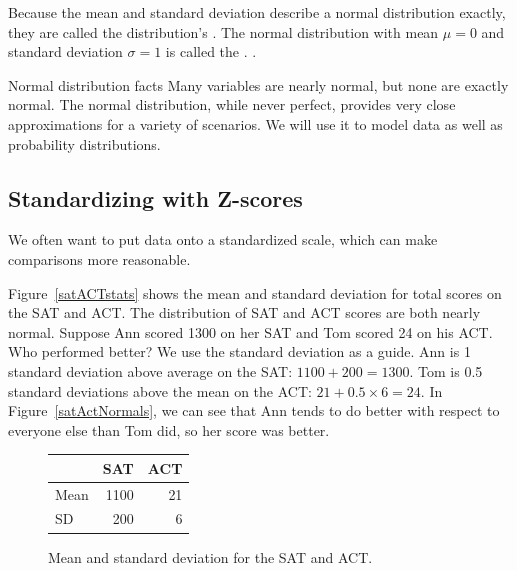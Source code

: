 Because the mean and standard deviation describe a normal distribution exactly, they are called the distribution's .  The normal distribution with mean $\mu=0$ and standard deviation $\sigma = 1$ is called the .%
.


\begin{onebox}{Normal distribution facts}
Many variables are nearly normal, but none are exactly normal. The normal distribution, while never perfect, provides very close approximations for a variety of scenarios. We will use it to model data as well as probability distributions.\vspace{0.7mm}\end{onebox}


\D{\newpage}

\subsection{Standardizing with Z-scores}
\noindent%
We often want to put data onto a standardized scale,
which can make comparisons more reasonable.

\newcommand{\satmean}{1100}
\newcommand{\satsd}{200}
\newcommand{\actmean}{21}
\newcommand{\actsd}{6}
\newcommand{\annsatscore}{1300}
\newcommand{\annsatzscore}{1}
\newcommand{\tomsatscore}{24}
\newcommand{\tomsatzscore}{0.5}

\begin{examplewrap}
\begin{nexample}{Figure~\vref{satACTstats} shows the mean
    and standard deviation for total scores on the SAT and ACT.
    The distribution of SAT and ACT scores are both nearly normal.
    Suppose Ann scored \annsatscore{} on her SAT and Tom scored
    \tomsatscore{} on his ACT.
    Who performed better?}
  \label{actSAT}%
  We use the standard deviation as a guide.
  Ann is \annsatzscore{} standard deviation above average
  on the SAT: $\satmean{} + \satsd{} = \annsatscore{}$.
  Tom is \tomsatzscore{} standard deviations above the mean
  on the ACT:
  $\actmean{} + \tomsatzscore{} \times \actsd{} = \tomsatscore{}$.
  In Figure~\ref{satActNormals}, we can see that Ann tends
  to do better with respect to everyone else than Tom did,
  so her score was better.
\end{nexample}
\end{examplewrap}

\begin{figure}[h]
\centering
\begin{tabular}{l r r}
  \hline
  & SAT & ACT \\
  \hline
  Mean \hspace{0.3cm} & \satmean{} & \actmean{} \\
  SD & \satsd{} & \actsd{} \\
  \hline
\end{tabular}
\caption{Mean and standard deviation for the SAT and ACT.}
\label{satACTstats}
\end{figure}

